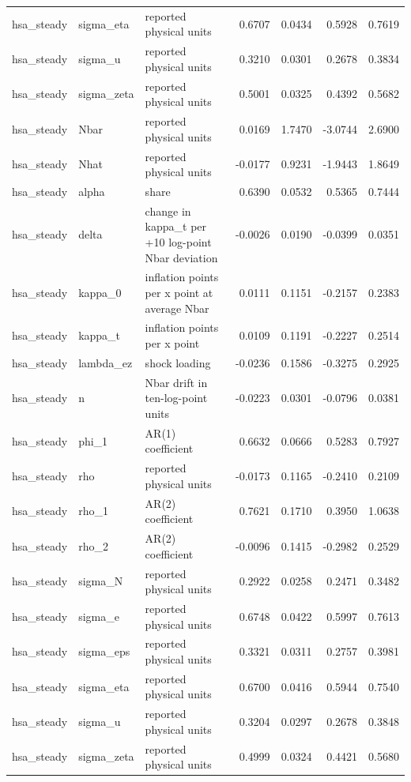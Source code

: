 \begin{tabular}{lllrrrr}
hsa\_steady & sigma\_eta & reported physical units & 0.6707 & 0.0434 & 0.5928 & 0.7619 \\
hsa\_steady & sigma\_u & reported physical units & 0.3210 & 0.0301 & 0.2678 & 0.3834 \\
hsa\_steady & sigma\_zeta & reported physical units & 0.5001 & 0.0325 & 0.4392 & 0.5682 \\
hsa\_steady & Nbar & reported physical units & 0.0169 & 1.7470 & -3.0744 & 2.6900 \\
hsa\_steady & Nhat & reported physical units & -0.0177 & 0.9231 & -1.9443 & 1.8649 \\
hsa\_steady & alpha & share & 0.6390 & 0.0532 & 0.5365 & 0.7444 \\
hsa\_steady & delta & change in kappa\_t per +10 log-point Nbar deviation & -0.0026 & 0.0190 & -0.0399 & 0.0351 \\
hsa\_steady & kappa\_0 & inflation points per x point at average Nbar & 0.0111 & 0.1151 & -0.2157 & 0.2383 \\
hsa\_steady & kappa\_t & inflation points per x point & 0.0109 & 0.1191 & -0.2227 & 0.2514 \\
hsa\_steady & lambda\_ez & shock loading & -0.0236 & 0.1586 & -0.3275 & 0.2925 \\
hsa\_steady & n & Nbar drift in ten-log-point units & -0.0223 & 0.0301 & -0.0796 & 0.0381 \\
hsa\_steady & phi\_1 & AR(1) coefficient & 0.6632 & 0.0666 & 0.5283 & 0.7927 \\
hsa\_steady & rho & reported physical units & -0.0173 & 0.1165 & -0.2410 & 0.2109 \\
hsa\_steady & rho\_1 & AR(2) coefficient & 0.7621 & 0.1710 & 0.3950 & 1.0638 \\
hsa\_steady & rho\_2 & AR(2) coefficient & -0.0096 & 0.1415 & -0.2982 & 0.2529 \\
hsa\_steady & sigma\_N & reported physical units & 0.2922 & 0.0258 & 0.2471 & 0.3482 \\
hsa\_steady & sigma\_e & reported physical units & 0.6748 & 0.0422 & 0.5997 & 0.7613 \\
hsa\_steady & sigma\_eps & reported physical units & 0.3321 & 0.0311 & 0.2757 & 0.3981 \\
hsa\_steady & sigma\_eta & reported physical units & 0.6700 & 0.0416 & 0.5944 & 0.7540 \\
hsa\_steady & sigma\_u & reported physical units & 0.3204 & 0.0297 & 0.2678 & 0.3848 \\
hsa\_steady & sigma\_zeta & reported physical units & 0.4999 & 0.0324 & 0.4421 & 0.5680 \\

\end{tabular}
